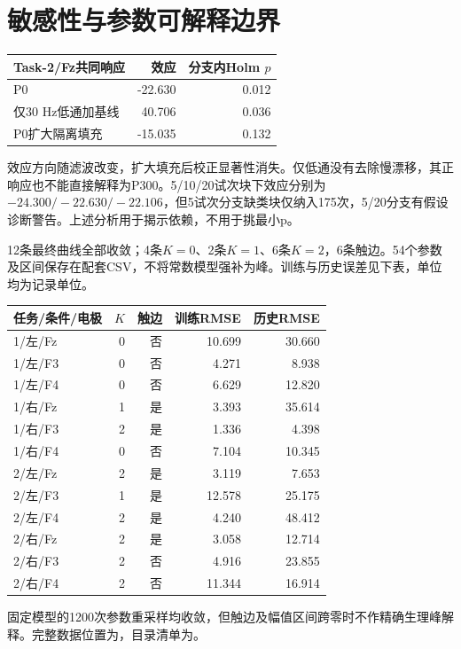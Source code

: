 \documentclass[UTF8,a4paper,11pt,fontset=fandol]{ctexart}
\begin{document}
\section{敏感性与参数可解释边界}
\begin{center}
\begin{tabular}{lrr}
\toprule
Task-2/Fz共同响应 & 效应 & 分支内Holm $p$\\
\midrule
P0 & -22.630 & 0.012\\
仅30 Hz低通加基线 & 40.706 & 0.036\\
P0扩大隔离填充 & -15.035 & 0.132\\
\bottomrule
\end{tabular}
\end{center}
效应方向随滤波改变，扩大填充后校正显著性消失。仅低通没有去除慢漂移，其正响应也不能直接解释为P300。5/10/20试次块下效应分别为$-24.300/-22.630/-22.106$，但5试次分支缺类块仅纳入175次，5/20分支有假设诊断警告。上述分析用于揭示依赖，不用于挑最小p。

12条最终曲线全部收敛；4条$K=0$、2条$K=1$、6条$K=2$，6条触边。54个参数及区间保存在配套CSV，不将常数模型强补为峰。训练与历史误差见下表，单位均为记录单位。
\begin{center}
\begin{tabular}{lrrrr}
\toprule
任务/条件/电极 & $K$ & 触边 & 训练RMSE & 历史RMSE\\
\midrule
1/左/Fz & 0 & 否 & 10.699 & 30.660\\
1/左/F3 & 0 & 否 & 4.271 & 8.938\\
1/左/F4 & 0 & 否 & 6.629 & 12.820\\
1/右/Fz & 1 & 是 & 3.393 & 35.614\\
1/右/F3 & 2 & 是 & 1.336 & 4.398\\
1/右/F4 & 0 & 否 & 7.104 & 10.345\\
2/左/Fz & 2 & 是 & 3.119 & 7.653\\
2/左/F3 & 1 & 是 & 12.578 & 25.175\\
2/左/F4 & 2 & 是 & 4.240 & 48.412\\
2/右/Fz & 2 & 是 & 3.058 & 12.714\\
2/右/F3 & 2 & 否 & 4.916 & 23.855\\
2/右/F4 & 2 & 否 & 11.344 & 16.914\\
\bottomrule
\end{tabular}
\end{center}
固定模型的1200次参数重采样均收敛，但触边及幅值区间跨零时不作精确生理峰解释。完整数据位置为，目录清单为。
\end{document}

